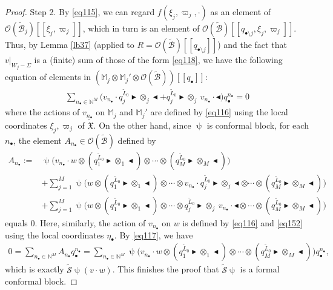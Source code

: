 \documentclass[12pt,a4paper,notitlepage]{report}
\theoremstyle{definition}
\theoremstyle{plain}
\newcommand{\fk}{\mathfrak}
\newcommand{\mc}{\mathcal}
\newcommand{\wtd}{\widetilde}
\newcommand{\scr}{\mathscr}
\newcommand{\blt}{\bullet}
\newcommand{\Mbb}{\mathbb M}
\newcommand{\Nbb}{\mathbb N}
\newcommand{\btl}{\blacktriangleleft}
\newcommand{\btr}{\blacktriangleright}
\numberwithin{equation}{section}
\begin{document}
\begin{proof}
Step 2. By \eqref{eq115}, we can regard $f(\xi_j,\varpi_j,\cdot)$ as an element of $\scr O(\wtd{\mc B}_j)[[\xi_j,\varpi_j]]$, which in turn is an element of $\scr O(\wtd{\mc B})[[q_{\blt\setminus j},\xi_j,\varpi_j]]$. Thus, by Lemma \ref{lb37} (applied to $R=\scr O(\wtd{\mc B})[[q_{\blt\setminus j}]]$) and the fact that $v|_{W_j-\Sigma}$ is a (finite) sum of those of the form \eqref{eq118}, we have the following equation of elements in $(\Mbb_j\otimes\Mbb_j'\otimes \scr O(\wtd{\mc B}))[[q_\blt]]$:
\begin{align}
\sum_{n_\blt\in\Nbb^M}\big(v_{n_\blt}\cdot q_j^{\wtd L_0}\btr\otimes_j\btl+ q_j^{\wtd L_0}\btr\otimes_j~ v_{n_\blt}\cdot\btl\big)q_\blt^{n_\blt} =0\label{eq117}
\end{align}
where the actions of $v_{n_\blt}$ on $\Mbb_j$ and $\Mbb_j'$ are defined by \eqref{eq116} using the  local coordinates $\xi_j,\varpi_j$ of $\wtd{\fk X}$. On the other hand, since $\uppsi$ is  conformal block, for each $n_\blt$, the element $A_{n_\blt}\in\scr O(\wtd{\mc B})$ defined by
\begin{align*}
A_{n_\blt}:=&\uppsi\Big(v_{n_\blt}\cdot w\otimes (q_1^{\wtd L_0}\btr\otimes_1\btl)\otimes\cdots\otimes (q_M^{\wtd L_0}\btr\otimes_M\btl)\Big)\nonumber\\
&+\sum_{j=1}^M\uppsi\Big(w\otimes (q_1^{\wtd L_0}\btr\otimes_1\btl)\otimes\cdots\otimes v_{n_\blt}\cdot q_j^{\wtd L_0}\btr\otimes_j\btl \otimes\cdots\otimes (q_M^{\wtd L_0}\btr\otimes_M\btl)\Big)\nonumber\\
&+\sum_{j=1}^M\uppsi\Big(w\otimes (q_1^{\wtd L_0}\btr\otimes_1\btl)\otimes\cdots\otimes  q_j^{\wtd L_0}\btr\otimes_j~v_{n_\blt}\cdot\btl \otimes\cdots\otimes (q_M^{\wtd L_0}\btr\otimes_M\btl)\Big)
\end{align*}
equals $0$. Here, similarly, the action of $v_{n_\blt}$ on $w$ is defined by \eqref{eq116} and \eqref{eq152} using the local coordinates $\eta_\blt$.  By \eqref{eq117}, we have
\begin{align*}
0=\sum_{n_\blt\in\Nbb^M}A_{n_\blt}q_\blt^{n_\blt}=\sum_{n_\blt\in\Nbb^M}\uppsi\Big(v_{n_\blt}\cdot w\otimes (q_1^{\wtd L_0}\btr\otimes_1\btl)\otimes\cdots\otimes (q_M^{\wtd L_0}\btr\otimes_M\btl)\Big)q_\blt^{n_\blt},
\end{align*}
which is exactly $\wtd{\mc S}\uppsi(v\cdot w)$. This finishes the proof that $\wtd{\mc S}\uppsi$ is a formal conformal block.
\end{proof}
\end{document}
